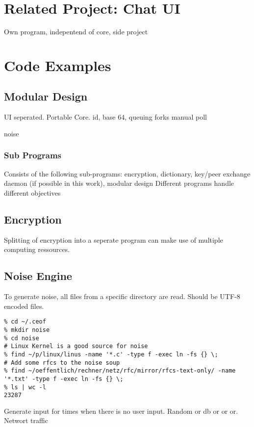 \section{Related Project: Chat UI}
Own program, indepentend of core, side project
\section{Code Examples}
\subsection{Modular Design}
UI seperated.
Portable Core.
id, base 64, 
queuing
forks
manual poll

noise

\subsubsection{Sub Programs}
Consists of the following sub-programs:
encryption, dictionary, key/peer exchange daemon (if possible in this work),
modular design
Different programs handle different objectives

\subsection{Encryption}
Splitting of encryption into a seperate program can make use of
multiple computing ressources.
\subsection{Noise Engine}
To generate noise, all files from a specific directory are read.
Should be UTF-8 encoded files.

\begin{verbatim}
% cd ~/.ceof 
% mkdir noise
% cd noise 
# Linux Kernel is a good source for noise
% find ~/p/linux/linus -name '*.c' -type f -exec ln -fs {} \;
# Add some rfcs to the noise soup
% find ~/oeffentlich/rechner/netz/rfc/mirror/rfcs-text-only/ -name '*.txt' -type f -exec ln -fs {} \;
% ls | wc -l
23287
\end{verbatim}

Generate input for times when there is no user input.
Random or db or or or.
Networt traffic

